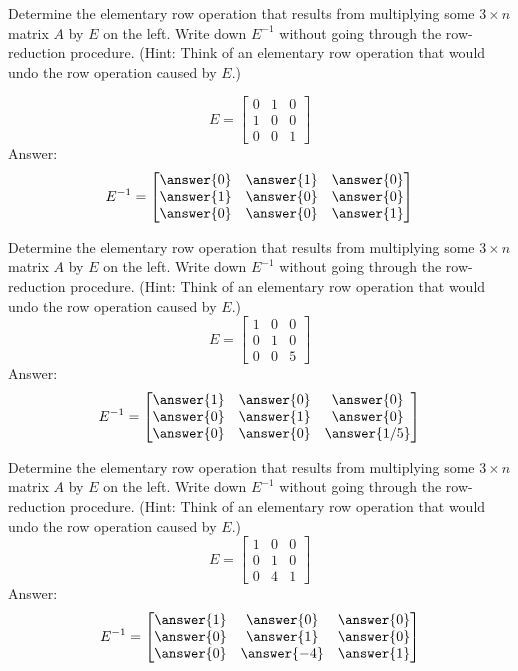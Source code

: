 \documentclass{ximera}
\begin{document}
\begin{problem}\label{prob:elemmatrices1}
Determine the elementary row operation that results from multiplying some $3\times n$ matrix $A$ by $E$ on the left.  Write down $E^{-1}$ without going through the row-reduction procedure.
(Hint: Think of an elementary row operation that would undo the row operation caused by $E$.)

$$E=\begin{bmatrix}0&1&0\\1&0&0\\0&0&1\end{bmatrix}$$
Answer:
$$E^{-1}=\begin{bmatrix}\answer{0}&\answer{1}&\answer{0}\\\answer{1}&\answer{0}&\answer{0}\\\answer{0}&\answer{0}&\answer{1}\end{bmatrix}$$
\end{problem}

\begin{problem}\label{prob:elemmatrices2}
Determine the elementary row operation that results from multiplying some $3\times n$ matrix $A$ by $E$ on the left.  Write down $E^{-1}$ without going through the row-reduction procedure.
(Hint: Think of an elementary row operation that would undo the row operation caused by $E$.)
$$E=\begin{bmatrix}1&0&0\\0&1&0\\0&0&5\end{bmatrix}$$
Answer:
$$E^{-1}=\begin{bmatrix}\answer{1}&\answer{0}&\answer{0}\\\answer{0}&\answer{1}&\answer{0}\\\answer{0}&\answer{0}&\answer{1/5}\end{bmatrix}$$
\end{problem}

\begin{problem}\label{prob:elemmatrices3}
Determine the elementary row operation that results from multiplying some $3\times n$ matrix $A$ by $E$ on the left.  Write down $E^{-1}$ without going through the row-reduction procedure.
(Hint: Think of an elementary row operation that would undo the row operation caused by $E$.)
$$E=\begin{bmatrix}1&0&0\\0&1&0\\0&4&1\end{bmatrix}$$
Answer:
$$E^{-1}=\begin{bmatrix}\answer{1}&\answer{0}&\answer{0}\\\answer{0}&\answer{1}&\answer{0}\\\answer{0}&\answer{-4}&\answer{1}\end{bmatrix}$$
\end{problem}
\end{document}
